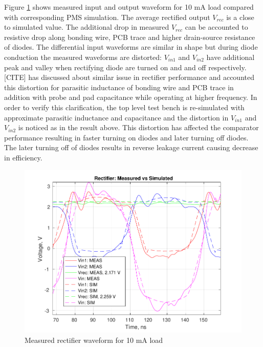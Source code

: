 \documentclass[UKenglish]{ifimaster}  %
\begin{document}
Figure \ref{fig:meas_rect_10ma} shows measured input and output waveform for 10 mA load compared with corresponding 
PMS simulation. The average rectified output $V_{rec}$ is a close to simulated value. The additional drop in measured $V_{rec}$
 can be accounted to resistive drop along bonding wire, PCB trace and higher drain-source resistance of diodes. The differential input waveforms are similar in shape 
 but during diode conduction the measured waveforms are distorted: $V_{in1}$ and $V_{in2}$ have additional peak and valley 
 when rectifying diode are turned on and and off respectively. [CITE] has discussed about similar issue in rectifier 
 performance and accounted this distortion for parasitic inductance of bonding wire and PCB trace in addition with probe and 
 pad capacitance while operating at higher frequency. In order to verify this clarification, the top level test bench is re-simulated with approximate parasitic 
 inductance and capacitance and the distortion in $V_{in1}$ and $V_{in2}$ is noticed as in the result above. This distortion 
 has affected the comparator performance resulting in faster turning on diodes and later turning off diodes. The later turning 
 off of diodes results in reverse leakage current causing decrease in efficiency. \\

\begin{figure} [!htbp]
  \centering
  \includegraphics[width=\textwidth]{img/meas/rect_10ma.pdf} 
 \caption{Measured rectifier waveform for 10 mA load} 
\label{fig:meas_rect_10ma} 
\end{figure}
\end{document}
